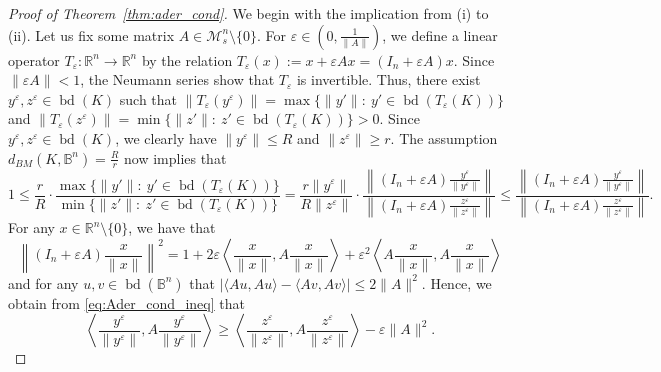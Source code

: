 \documentclass[12pt,a4paper]{article}
\theoremstyle{definition}
\DeclareMathOperator{\bd}{bd}
\newcommand\R{\mathbb{R}}
\newcommand\B{\mathbb{B}}
\newcommand\ms[1]{\mathcal{M}_s^{#1}}
\begin{document}
\begin{proof}[Proof of Theorem~\ref{thm:ader_cond}]
We begin with the implication from (i) to (ii). Let us fix some matrix $A \in \ms{n} \setminus \{0\}$. For $\varepsilon \in \left (0,\frac{1}{\|A\|} \right )$, we define a linear operator $T_\varepsilon \colon \R^n \to \R^n$ by the relation $T_\varepsilon(x) := x + \varepsilon A x = (I_n + \varepsilon A) x$. Since $\|\varepsilon A\| < 1$, the Neumann series show that $T_\varepsilon$ is invertible. Thus, there exist $y^\varepsilon, z^\varepsilon \in \bd(K)$ such that $\|T_\varepsilon(y^\varepsilon)\| = \max \{ \|y'\| : \ y' \in \bd(T_\varepsilon(K)) \}$ and $\|T_\varepsilon(z^\varepsilon)\| = \min \{ \|z'\| : \ z' \in \bd(T_\varepsilon(K)) \} > 0$. Since $y^\varepsilon, z^\varepsilon \in \bd(K)$, we clearly have $\|y^\varepsilon\| \leq R$ and $\|z^\varepsilon\| \geq r$. The assumption $d_{BM}(K,\B^n) = \frac{R}{r}$ now implies that
\begin{equation}
\label{eq:Ader_cond_ineq}
1 \leq \frac{r}{R} \cdot \frac{\max \{ \|y'\| : \ y' \in \bd(T_\varepsilon(K)) \}}{\min \{ \|z'\| : \ z' \in \bd(T_\varepsilon(K))\}}
= \frac{r \|y^\varepsilon\|}{R \|z^\varepsilon\|} \cdot \frac{\left\| (I_n + \varepsilon A) \frac{y^\varepsilon}{\|y^\varepsilon\|}\right\|}{\left\| (I_n + \varepsilon A) \frac{z^\varepsilon}{\|z^\varepsilon\|}\right\|} \leq \frac{\left\| (I_n + \varepsilon A) \frac{y^\varepsilon}{\|y^\varepsilon\|}\right\|}{\left\| (I_n + \varepsilon A) \frac{z^\varepsilon}{\|z^\varepsilon\|}\right\|}.
\end{equation}
For any $x \in \R^n \setminus \{0\}$, we have that
$$ \left\| (I_n + \varepsilon A) \frac{x}{\|x\|} \right\|^2 = 1 + 2 \varepsilon \left\langle \frac{x}{\|x\|}, A \frac{x}{\|x\|} \right\rangle + \varepsilon^2 \left\langle A \frac{x}{\|x\|}, A \frac{x}{\|x\|} \right\rangle $$
and for any $u,v \in \bd(\B^n)$ that $|\langle Au, Au \rangle - \langle Av, Av \rangle| \leq 2 \|A\|^2$. Hence, we obtain from \eqref{eq:Ader_cond_ineq} that
$$ \left\langle \frac{y^\varepsilon}{\|y^\varepsilon\|}, A \frac{y^\varepsilon}{\|y^\varepsilon\|} \right\rangle \geq \left\langle \frac{z^\varepsilon}{\|z^\varepsilon\|}, A \frac{z^\varepsilon}{\|z^\varepsilon\|} \right\rangle - \varepsilon \|A\|^2. $$
\newpage


\end{proof}
\end{document}
